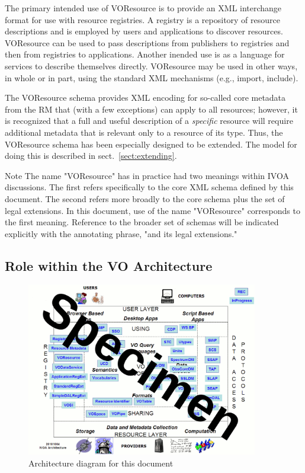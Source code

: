 \documentclass[11pt,a4paper]{ivoa}
\begin{document}
The primary intended use of VOResource is to provide an XML interchange
format for use with resource registries.  A registry is a repository of
resource descriptions and is employed by users and applications to
discover resources.  VOResource can be used to pass descriptions from
publishers to registries and then from registries to applications.
Another inended use is as a language for services to describe themselves
directly.  VOResource may be used in other ways, in whole or in part,
using the standard XML mechanisms (e.g., import, include).  

The VOResource schema provides XML encoding for so-called core
metadata from the RM that (with a few exceptions)
can apply to all resources; however, it is recognized that a full and
useful description of a \emph{specific} resource will require
additional metadata that is relevant only to a resource of its type.
Thus, the VOResource schema has been especially designed to be
extended.  The model for doing this is described in
sect.~\ref{sect:extending}.

\begin{admonition}{Note}
The name "VOResource" has in practice had two meanings within
IVOA discussions.  The first refers specifically to the core
XML schema defined by this document.  The second refers more
broadly to the core schema plus the set of legal extensions.
In this document, use of the name "VOResource" corresponds to
the first meaning.  Reference to the broader set of schemas
will be indicated explicitly with the annotating phrase, "and
its legal extensions."
\end{admonition}

\subsection{Role within the VO Architecture}

\begin{figure}
\centering

\includegraphics[width=0.9\textwidth]{archdiag.png}
\caption{Architecture diagram for this document}
\label{fig:archdiag}
\end{figure}
\end{document}
